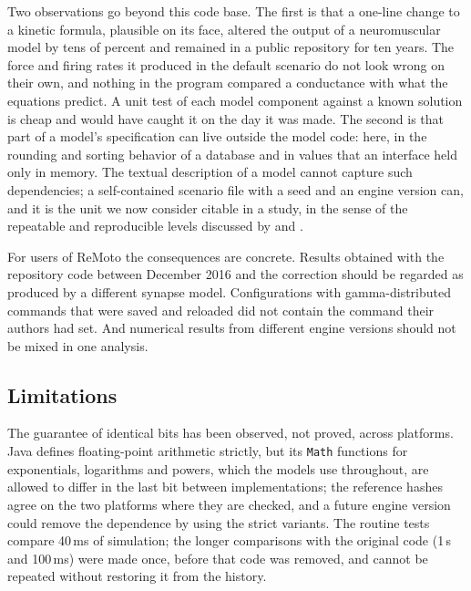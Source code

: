 \documentclass[pdflatex,sn-apa,iicol]{sn-jnl}
\providecommand{\code}[1]{\texttt{#1}}
\begin{document}
Two observations go beyond this code base. The first is that a one-line change to a kinetic formula, plausible on its face, altered the output of a neuromuscular model by tens of percent and remained in a public repository for ten years. The force and firing rates it produced in the default scenario do not look wrong on their own, and nothing in the program compared a conductance with what the equations predict. A unit test of each model component against a known solution is cheap and would have caught it on the day it was made. The second is that part of a model's specification can live outside the model code: here, in the rounding and sorting behavior of a database and in values that an interface held only in memory. The textual description of a model \citep{Nordlie2009} cannot capture such dependencies; a self-contained scenario file with a seed and an engine version can, and it is the unit we now consider citable in a study, in the sense of the repeatable and reproducible levels discussed by \citet{Benureau2018} and \citet{Plesser2018}.

For users of ReMoto the consequences are concrete. Results obtained with the repository code between December 2016 and the correction should be regarded as produced by a different synapse model. Configurations with gamma-distributed commands that were saved and reloaded did not contain the command their authors had set. And numerical results from different engine versions should not be mixed in one analysis.

\subsection{Limitations}\label{sec:limitations}

The guarantee of identical bits has been observed, not proved, across platforms. Java defines floating-point arithmetic strictly, but its \code{Math} functions for exponentials, logarithms and powers, which the models use throughout, are allowed to differ in the last bit between implementations; the reference hashes agree on the two platforms where they are checked, and a future engine version could remove the dependence by using the strict variants.
The routine tests compare 40\,ms of simulation; the longer comparisons with the original code (1\,s and 100\,ms) were made once, before that code was removed, and cannot be repeated without restoring it from the history.
\end{document}
